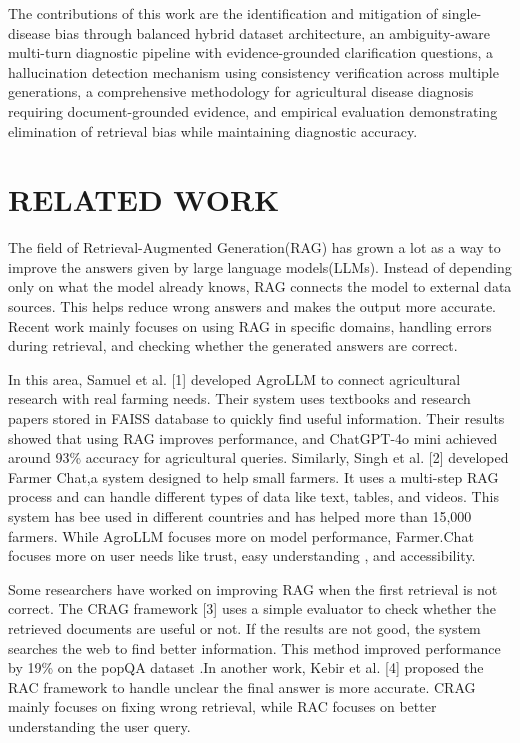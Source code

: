 \documentclass[conference]{IEEEtran}
\begin{document}
The contributions of this work are the identification and mitigation of single-disease bias through balanced hybrid dataset architecture, an ambiguity-aware multi-turn diagnostic pipeline with evidence-grounded clarification questions, a hallucination detection mechanism using consistency verification across multiple generations, a comprehensive methodology for agricultural disease diagnosis requiring document-grounded evidence, and empirical evaluation demonstrating elimination of retrieval bias while maintaining diagnostic accuracy.

\section{RELATED WORK}

The field of Retrieval-Augmented Generation(RAG) has grown a lot as a way to improve the answers given by large language models(LLMs). Instead of depending only on what the model already knows, RAG connects the model to external data sources. This helps reduce wrong answers and makes the output more accurate. Recent work mainly focuses on using RAG in specific domains, handling errors during retrieval, and checking whether the generated answers are correct.

In this area, Samuel et al. [1] developed AgroLLM to connect agricultural research with real farming needs. Their system uses textbooks and research papers stored in FAISS database to quickly find useful information. Their results showed that using RAG improves performance, and ChatGPT-4o mini achieved around 93\% accuracy for agricultural queries. Similarly, Singh et al. [2] developed Farmer Chat,a system designed to help small farmers. It uses a multi-step RAG process and can handle different types of data like text, tables, and videos. This system has bee used in different countries and has helped more than 15,000 farmers. While AgroLLM focuses more on model performance, Farmer.Chat focuses more on user needs like trust, easy understanding , and accessibility.

Some researchers have worked on improving RAG when the first retrieval is not correct. The CRAG framework [3] uses a simple evaluator to check whether the retrieved documents are useful or not. If the results are not good, the system searches the web to find better information. This method improved performance by 19\% on the popQA dataset .In another work, Kebir et al. [4] proposed the RAC framework to handle unclear the final answer is more accurate. CRAG mainly focuses on fixing wrong retrieval, while RAC focuses on better understanding the user query.
\end{document}
